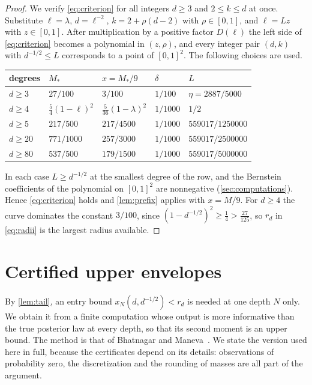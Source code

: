 \documentclass[11pt]{amsart}
\theoremstyle{definition}
\theoremstyle{remark}
\begin{document}
\begin{proof}
We verify \eqref{eq:criterion} for all integers $d\ge3$ and $2\le k\le d$ at once. Substitute $\ell=\lambda$,
$d=\ell^{-2}$, $k=2+\rho(d-2)$ with $\rho\in[0,1]$, and $\ell=Lz$ with $z\in[0,1]$. After multiplication by a
positive factor $D(\ell)$ the left side of \eqref{eq:criterion} becomes a polynomial in $(z,\rho)$, and every
integer pair $(d,k)$ with $d^{-1/2}\le L$ corresponds to a point of $[0,1]^2$. The following choices are used.
\begin{center}
\begin{tabular}{lllll}
\hline
degrees & $M_*$ & $x=M_*/9$ & $\delta$ & $L$\\
\hline
$d\ge3$ & $27/100$ & $3/100$ & $1/100$ & $\eta=2887/5000$\\
$d\ge4$ & $\tfrac54(1-\ell)^2$ & $\tfrac5{36}(1-\lambda)^2$ & $1/1000$ & $1/2$\\
$d\ge5$ & $217/500$ & $217/4500$ & $1/1000$ & $559017/1250000$\\
$d\ge20$ & $771/1000$ & $257/3000$ & $1/1000$ & $559017/2500000$\\
$d\ge80$ & $537/500$ & $179/1500$ & $1/1000$ & $559017/5000000$\\
\hline
\end{tabular}
\end{center}
In each case $L\ge d^{-1/2}$ at the smallest degree of the row, and the Bernstein coefficients of the polynomial
on $[0,1]^2$ are nonnegative (\cref{sec:computations}). Hence \eqref{eq:criterion} holds and \cref{lem:prefix}
applies with $x=M/9$. For $d\ge4$ the curve dominates the constant $3/100$, since
$(1-d^{-1/2})^2\ge\tfrac14>\tfrac{27}{125}$, so $r_d$ in \eqref{eq:radii} is the largest radius available.
\end{proof}

\section{Certified upper envelopes}\label{sec:envelope}

By \cref{lem:tail}, an entry bound $x_N(d,d^{-1/2})<r_d$ is needed at one depth $N$ only. We obtain it from a
finite computation whose output is more informative than the true posterior law at every depth, so that its second
moment is an upper bound. The method is that of Bhatnagar and Maneva~\cite{BM11}. We state the version used here
in full, because the certificates depend on its details: observations of probability zero, the discretization
and the rounding of masses are all part of the argument.
\end{document}
